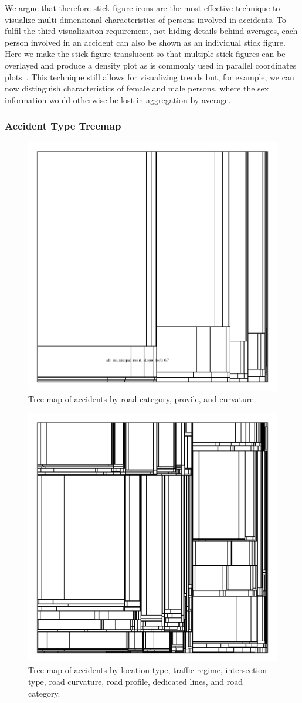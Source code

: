 We argue that therefore stick figure icons are the most effective technique to visualize multi-dimensional characteristics of persons involved in accidents.
To fulfil the third visualizaiton requirement, not hiding details behind averages, each person involved in an accident can also be shown as an individual stick figure. Here we make the stick figure translucent so that multiple stick figures can be overlayed and produce a density plot as is commonly used in parallel coordinates plots~\cite{Wegman1990}.
This technique still allows for visualizing trends but, for example, we can now distinguish characteristics of female and male persons, where the sex information would otherwise be lost in aggregation by average.

\subsubsection{Accident Type Treemap}
\begin{figure}
    \centering
    \includegraphics[width=0.6\linewidth]{figures/tree-treemap-road-category-road-profile-road-curvature.png}
    \caption{Tree map of accidents by road category, provile, and curvature.}
    \label{figure-treemap-road-category-profile-curvature}
\end{figure}
\begin{figure}
    \centering
    \includegraphics[width=0.6\linewidth]{figures/tree-treemap-location-type-traffic-regime-intersection-type-road-curvature-road-profile-dedicated-line-road-category.png}
    \caption{Tree map of accidents by location type, traffic regime, intersection type, road curvature, road profile, dedicated lines, and road category.}
    \label{figure-treemap-many}
\end{figure}
